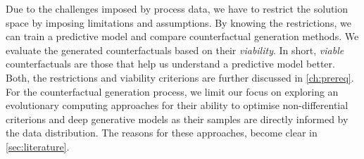 \documentclass[./../../paper.tex]{subfiles}
\begin{document}
Due to the challenges imposed by process data, we have to restrict the solution space by imposing limitations and assumptions. 
By knowing the restrictions, we can train a predictive model and compare counterfactual generation methods. 
We evaluate the generated counterfactuals based on their \emph{viability}. In short, \emph{viable} counterfactuals are those that help us understand a predictive model better.
Both, the restrictions and viability criterions are further discussed in \autoref{ch:prereq}. 
For the counterfactual generation process, we limit our focus on exploring an evolutionary computing approaches for their ability to optimise non-differential criterions and deep generative models as their samples are directly informed by the data distribution. 
The reasons for these approaches, become clear in \autoref{sec:literature}.    
\end{document}
